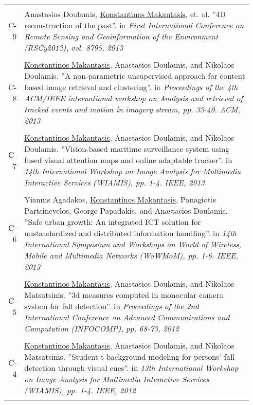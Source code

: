 \documentclass[a4paper,10pt]{article}
\begin{document}
\begin{longtable}{r p{11cm}}
 \multicolumn{2}{c}{} \\
C-9 &\small{Anastasios Doulamis, \underline{Konstantinos Makantasis}, et. al. ''4D reconstruction of the past''. in \textit{First International Conference on Remote Sensing and Geoinformation of the Environment (RSCy2013), vol. 8795, 2013}}\\
 \multicolumn{2}{c}{} \\
C-8 &\small{\underline{Konstantinos Makantasis}, Anastasios Doulamis, and Nikolaos Doulamis. ''A non-parametric unsupervised approach for content based image retrieval and clustering''. in \textit{Proceedings of the 4th ACM/IEEE international workshop on Analysis and retrieval of tracked events and motion in imagery stream, pp. 33-40. ACM, 2013}}\\
 \multicolumn{2}{c}{} \\
C-7 &\small{\underline{Konstantinos Makantasis}, Anastasios Doulamis, and Nikolaos Doulamis. ''Vision-based maritime surveillance system using fused visual attention maps and online adaptable tracker''. in \textit{14th International Workshop on Image Analysis for Multimedia Interactive Services (WIAMIS), pp. 1-4. IEEE, 2013}}\\
 \multicolumn{2}{c}{} \\
C-6 &\small{Yiannis Agadakos, \underline{Konstantinos Makantasis}, Panagiotis Partsinevelos, George Papadakis, and Anastasios Doulamis. ''Safe urban growth: An integrated ICT solution for unstandardized and distributed information handling''. in \textit{14th International Symposium and Workshops on World of Wireless, Mobile and Multimedia Networks (WoWMoM), pp. 1-6. IEEE, 2013}}\\
 \multicolumn{2}{c}{} \\
C-5 &\small{\underline{Konstantinos Makantasis}, Anastasios Doulamis, and Nikolaos Matsatsinis. ''3d measures computed in monocular camera system for fall detection''. in \textit{Proceedings of the 2nd International Conference on Advanced Communications and Computation (INFOCOMP), pp. 68-73, 2012}}\\
 \multicolumn{2}{c}{} \\
C-4 &\small{\underline{Konstantinos Makantasis}, Anastasios Doulamis, and Nikolaos Matsatsinis. ''Student-t background modeling for persons’ fall detection through visual cues''. in \textit{13th International Workshop on Image Analysis for Multimedia Interactive Services (WIAMIS), pp. 1-4. IEEE, 2012}}\\
 \multicolumn{2}{c}{} \\

\end{longtable}
\end{document}
